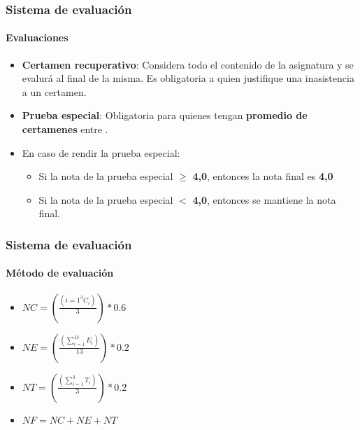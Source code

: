 \documentclass{beamer}
\begin{document}
		\begin{frame}
			\frametitle{Sistema de evaluaci\'on}
			\framesubtitle{Evaluaciones}
			\begin{itemize}
				\item \textbf{Certamen recuperativo}: Considera todo el contenido de la asignatura y se evalur\'a al final de la misma. Es obligatoria a quien justifique una inasistencia a un certamen.
				\item \textbf{Prueba especial}: Obligatoria para quienes tengan \textbf{promedio de certamenes} entre \color{red}{3.5} \color{black}{y} \color{violet}{3.9}.
				\item En caso de rendir la prueba especial:
				\begin{itemize}
    				\item Si la nota de la prueba especial $\geq$ \textbf{4,0}, entonces la nota final es \textbf{4,0}
	    			\item Si la nota de la prueba especial $<$ \textbf{4,0}, entonces se mantiene la nota final.
				\end{itemize}
			\end{itemize}
		\end{frame}

		\newpage
		\begin{frame}
			\frametitle{Sistema de evaluaci\'on}
			\framesubtitle{M\'etodo de evaluaci\'on}
			\begin{block}{}
				\begin{center}
					\begin{itemize}
  							\item$NC =(\displaystyle\frac{\left(\displaystyle{i=1}^{3}{C_{i}}\right)}{3})*0.6$ \\
								\item$NE = (\displaystyle\frac{\left(\displaystyle\sum_{i=1}^{13}{E_{i}}\right)}{13})*0.2 $\\
  							\item$NT = (\displaystyle\frac{\left(\displaystyle\sum_{i=1}^{3}{T_{i}}\right)}{3})*0.2 $\\
								\item$NF = NC + NE + NT  $\\
					\end{itemize}
				\end{center}
		\end{block}
	\end{frame}
\newpage
\end{document}
